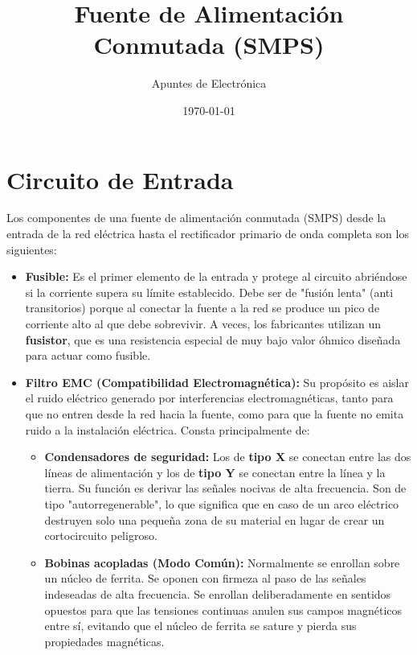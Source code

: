 \documentclass[12pt, a4paper]{article}
\begin{document}
\title{\textbf{Fuente de Alimentación Conmutada (SMPS)}}
\author{Apuntes de Electrónica}
\date{\today}
\maketitle

\section{Circuito de Entrada}
Los componentes de una fuente de alimentación conmutada (SMPS) desde la entrada de la red eléctrica hasta el rectificador primario de onda completa son los siguientes:

\begin{itemize}[itemsep=1.5ex]
    \item \textbf{Fusible:} Es el primer elemento de la entrada y protege al circuito abriéndose si la corriente supera su límite establecido. Debe ser de "fusión lenta" (anti transitorios) porque al conectar la fuente a la red se produce un pico de corriente alto al que debe sobrevivir. A veces, los fabricantes utilizan un \textbf{fusistor}, que es una resistencia especial de muy bajo valor óhmico diseñada para actuar como fusible.
    
    \item \textbf{Filtro EMC (Compatibilidad Electromagnética):} Su propósito es aislar el ruido eléctrico generado por interferencias electromagnéticas, tanto para que no entren desde la red hacia la fuente, como para que la fuente no emita ruido a la instalación eléctrica. Consta principalmente de:
    \begin{itemize}[itemsep=1ex, topsep=1ex]
        \item \textbf{Condensadores de seguridad:} Los de \textbf{tipo X} se conectan entre las dos líneas de alimentación y los de \textbf{tipo Y} se conectan entre la línea y la tierra. Su función es derivar las señales nocivas de alta frecuencia. Son de tipo "autorregenerable", lo que significa que en caso de un arco eléctrico destruyen solo una pequeña zona de su material en lugar de crear un cortocircuito peligroso.
        \item \textbf{Bobinas acopladas (Modo Común):} Normalmente se enrollan sobre un núcleo de ferrita. Se oponen con firmeza al paso de las señales indeseadas de alta frecuencia. Se enrollan deliberadamente en sentidos opuestos para que las tensiones continuas anulen sus campos magnéticos entre sí, evitando que el núcleo de ferrita se sature y pierda sus propiedades magnéticas.
    \end{itemize}


\end{itemize}
\end{document}
